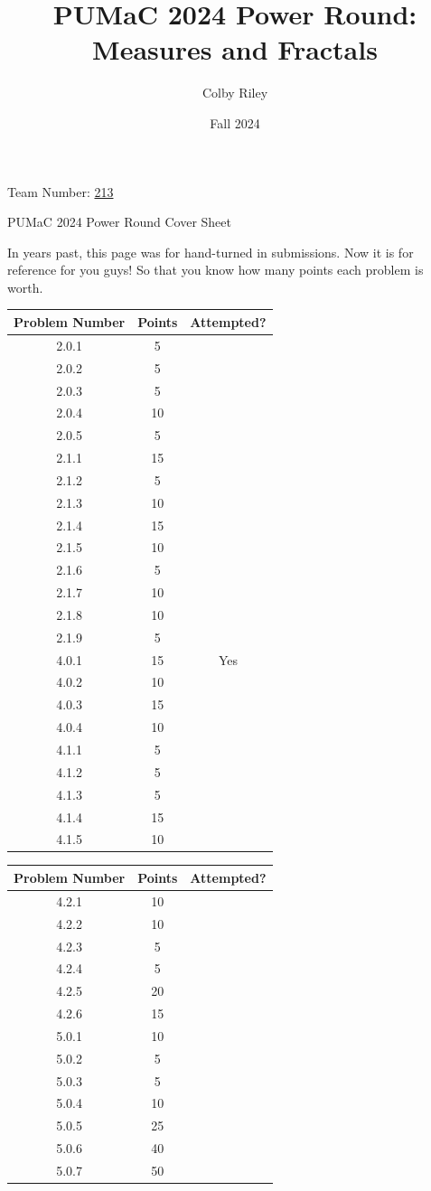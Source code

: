 \documentclass[11pt]{article}
\title{PUMaC 2024 Power Round: \\ Measures and Fractals}
\author{Colby Riley}
\date{Fall 2024}
\theoremstyle{definition}
\theoremstyle{remark}
\theoremstyle{problem}
\begin{document}
\thispagestyle{empty}
\noindent \huge{Team Number:} \underline{213\phantom{}}

\vspace{.5cm}
\noindent \huge{PUMaC 2024 Power Round Cover Sheet}

\vspace{.5cm}
\normalsize
In years past, this page was for hand-turned in submissions. Now it is for reference for you guys! So that you know how many points each problem is worth. 

\begin{center}
\begin{tabular}{|c|c|c|}\hline
Problem Number & Points & Attempted?\\\hline
2.0.1 & 5 &  \\\hline
2.0.2 & 5 &  \\\hline
2.0.3 & 5 &  \\\hline
2.0.4 & 10 &  \\\hline
2.0.5 & 5 &  \\\hline
2.1.1 & 15 &  \\\hline
2.1.2 & 5 &  \\\hline
2.1.3 & 10 &  \\\hline
2.1.4 & 15 & \\\hline
2.1.5 & 10 & \\\hline
2.1.6 & 5 & \\\hline
2.1.7 & 10 & \\\hline
2.1.8 & 10 & \\\hline
2.1.9 & 5 & \\\hline
4.0.1 & 15 & Yes \\\hline
4.0.2 & 10 & \\\hline
4.0.3 & 15 & \\\hline
4.0.4 & 10 & \\\hline
4.1.1 & 5 & \\\hline
4.1.2 & 5 & \\\hline
4.1.3 & 5 & \\\hline
4.1.4 & 15 & \\\hline
4.1.5 & 10 & \\\hline
\end{tabular}
\hspace{0.5 cm}
\begin{tabular}{|c|c|c|}\hline
Problem Number & Points & Attempted?\\\hline
4.2.1 & 10 & \\\hline
4.2.2 & 10 & \\\hline
4.2.3 & 5 & \\\hline
4.2.4 & 5 & \\\hline
4.2.5 & 20 & \\\hline
4.2.6 & 15 & \\\hline
5.0.1 & 10 & \\\hline
5.0.2 & 5 & \\\hline
5.0.3 & 5 & \\\hline
5.0.4 & 10 & \\\hline
5.0.5 & 25 & \\\hline
5.0.6 & 40 & \\\hline
5.0.7 & 50 & \\\hline
\end{tabular}
\end{center}
\end{document}
